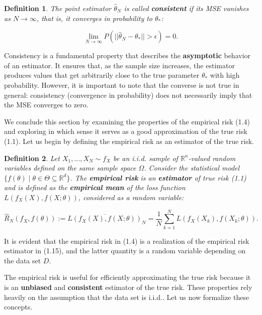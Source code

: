 \documentclass{report}
\newtheorem{definition}{Definition}[chapter]
\begin{document}
\begin{definition}
The point estimator $\hat{\theta}_N$ is called \textbf{consistent} if its MSE vanishes as $N \to \infty$, that is, it converges in probability to $\theta_*$:

\begin{equation}
\lim_{N \to \infty} P(||\hat{\theta}_N -\theta_*|| > \epsilon) = 0.
\end{equation}
\end{definition}
Consistency is a fundamental property that describes the \textbf{asymptotic} behavior of an estimator. It ensures that, as the sample size increases, the estimator produces values that get arbitrarily close to the true parameter $\theta_*$ with high probability. However, it is important to note that the converse is not true in general: consistency (convergence in probability) does not necessarily imply that the MSE converges to zero.

We conclude this section by examining the properties of the empirical risk (1.4) and exploring in which sense it serves as a good approximation of the true risk (1.1). Let us begin by defining the empirical risk as an estimator of the true risk.

\begin{definition}
Let $X_1,\dots,X_N \sim f_X$ be an i.i.d. sample of $\mathbb{R}^n$-valued random variables defined on the same sample space $\Omega$. Consider the statistical model $\{f(\theta) \mid \theta \in \Theta \subseteq \mathbb{R}^d\}$. The \textbf{empirical risk} is an \textbf{estimator} of true risk (1.1) and is defined as the \textbf{empirical mean} of the loss function $L(f_X(X), f(X;\theta))$, considered as a random variable:

\begin{equation}
\hat{R}_N(f_X,f(\theta)) := \overline{L(f_X(X),f(X;\theta))}_N = \frac{1}{N}\sum_{k=1}^{N}L(f_X(X_k),f(X_k;\theta)).
\end{equation}
\end{definition}
It is evident that the empirical risk in (1.4) is a realization of the empirical risk estimator in (1.15), and the latter quantity is a random variable depending on the data set $D$.

The empirical risk is useful for efficiently approximating the true risk because it is an \textbf{unbiased} and \textbf{consistent} estimator of the true risk. These properties rely heavily on the assumption that the data set is i.i.d.. Let us now formalize these concepts.
\end{document}
